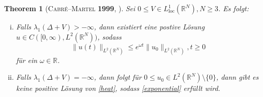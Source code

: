 \documentclass[11pt,twoside,a4paper]{article}
\newtheorem{thm}{Theorem}
\theoremstyle{break}
\begin{document}
\begin{thm}[\textsc{Cabr\'e--Martel} \textbf{1999}, \cite{cabre-martel}]\label{martel}
Sei $0\le V\in L^1_{\text{loc}}(\mathbb R^N), N\ge 3$.  Es folgt:
\begin{enumerate}[(i)]
\item Falls $\lambda_1(\Delta + V) > -\infty$, dann existiert eine postive L\"osung $u\in C([0,\infty), L^2(\mathbb R^N))$, sodass
\begin{equation}\label{exponential}
\|u(t)\|_{L^2(\mathbb R^N)} \le e^{\omega t} \|u_0\|_{L^2(\mathbb R^N)}, t\ge 0
\end{equation}
f\"ur ein $\omega\in \mathbb R$.
\item Falls $\lambda_1(\Delta + V)=-\infty$, dann folgt f\"ur $0\le u_0 \in L^2(\mathbb R^N)\setminus\{0\}$, dann gibt es keine positive L\"osung von \eqref{heat}, sodass \eqref{exponential} erfüllt wird.
\end{enumerate}
\end{thm}
\end{document}
